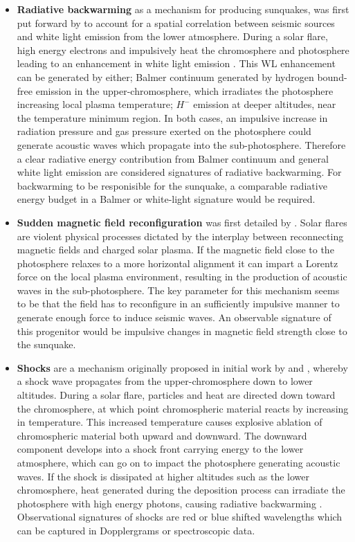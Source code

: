 \begin{itemize}
\item \textbf{Radiative backwarming} as a mechanism for producing sunquakes, was first put forward by \cite{2005ApJ...630.1168D} to account for a spatial correlation between seismic sources and white light emission from the lower atmosphere. During a solar flare, high energy electrons and impulsively heat the chromosphere and photosphere leading to an enhancement in white light emission \citep{1989SoPh..124..303M}. This WL enhancement can be generated by either; Balmer continuum generated by hydrogen bound-free emission in the upper-chromosphere, which irradiates the photosphere increasing local plasma temperature; $H^{-}$ emission at deeper altitudes, near the temperature minimum region. In both cases, an impulsive increase in radiation pressure and gas pressure exerted on the photosphere could generate acoustic waves which propagate into the sub-photosphere. Therefore a clear radiative energy contribution from Balmer continuum and general white light emission are considered signatures of radiative backwarming. For backwarming to be responisible for the sunquake, a comparable radiative energy budget in a Balmer or white-light signature would be required.\\

\item \textbf{Sudden magnetic field reconfiguration} was first detailed by \cite{2008ASPC..383..221H}. Solar flares are violent physical processes dictated by the interplay between reconnecting magnetic fields and charged solar plasma.
If the magnetic field close to the photosphere relaxes to a more horizontal alignment it can impart a Lorentz force on the local plasma environment, resulting in the production of acoustic waves in the sub-photosphere. The key parameter for this mechanism seems to be that the field has to reconfigure in an sufficiently impulsive manner to generate enough force to induce seismic waves. An observable signature of this progenitor would be impulsive changes in magnetic field strength close to the sunquake. \\

\item \textbf{Shocks} are a mechanism originally proposed in initial work by \cite{1995ESASP.376b.341K} and \cite{1998Natur.393..317K}, whereby a shock wave propagates from the upper-chromosphere down to lower altitudes. During a solar flare, particles and heat are directed down toward the chromosphere, at which point chromospheric material reacts by increasing in temperature. This increased temperature causes explosive ablation of chromospheric material both upward and downward. The downward component develops into a shock front carrying energy to the lower atmosphere, which can go on to impact the photosphere generating acoustic waves. If the shock is dissipated at higher altitudes such as the lower chromosphere, heat generated during the deposition process can irradiate the photosphere with high energy photons, causing radiative backwarming \citep{1989SoPh..124..303M}. Observational signatures of shocks are red or blue shifted wavelengths which can be captured in Dopplergrams or spectroscopic data. \\


\end{itemize}
